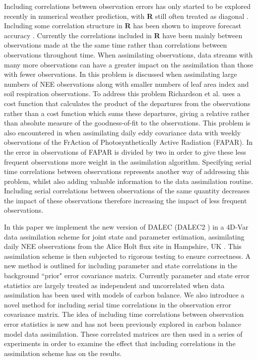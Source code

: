 \documentclass[review]{elsarticle}
\begin{document}
Including correlations between observation errors has only started to be explored recently in numerical weather prediction, with \textbf{R} still often treated as diagonal \citep{Stewart2013}. Including some correlation structure in \textbf{R} has been shown to improve forecast accuracy \citep{weston2014accounting}. Currently the correlations included in \textbf{R} have been mainly between observations made at the the same time rather than correlations between observations throughout time. When assimilating observations, data streams with many more observations can have a greater impact on the assimilation than those with fewer observations. In \citet{richardson2010estimating} this problem is discussed when assimilating large numbers of NEE observations along with smaller numbers of leaf area index and soil respiration observations. To address this problem Richardson et al. uses a cost function that calculates the product of the departures from the observations rather than a cost function which sums these departures, giving a relative rather than absolute measure of the goodness-of-fit to the observations. This problem is also encountered in \citet{Bacour2015} when assimilating daily eddy covariance data with weekly observations of the FrAction of Photosynthetically Active Radiation (FAPAR). In \citet{Bacour2015} the error in observations of FAPAR is divided by two in order to give these less frequent observations more weight in the assimilation algorithm. Specifying serial time correlations between observations represents another way of addressing this problem, whilst also adding valuable information to the data assimilation routine. Including serial correlations between observations of the same quantity decreases the impact of these observations \citep{jarvinen1999variational} therefore increasing the impact of less frequent observations. 

In this paper we implement the new version of DALEC (DALEC2 \citep{Bloom2015}) in a 4D-Var data assimilation scheme for joint state and parameter estimation, assimilating daily NEE observations from the Alice Holt flux site in Hampshire, UK \citep{wilkinson2012inter}. This assimilation scheme is then subjected to rigorous testing to ensure correctness. A new method is outlined for including parameter and state correlations in the background ``prior" error covariance matrix. Currently parameter and state error statistics are largely treated as independent and uncorrelated when data assimilation has been used with models of carbon balance. We also introduce a novel method for including serial time correlations in the observation error covariance matrix. The idea of including time correlations between observation error statistics is new and has not been previously explored in carbon balance model data assimilation. These correlated matrices are then used in a series of experiments in order to examine the effect that including correlations in the assimilation scheme has on the results.
\end{document}
